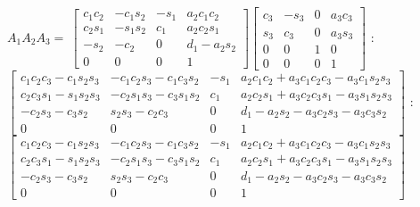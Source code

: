 \documentclass{article}
\begin{document}
$A_{1}A_{2}A_{3}=\ \left[ 
\begin{array}{cccc}
c_{1}c_{2} & -c_{1}s_{2} & -s_{1} & a_{2}c_{1}c_{2} \\ 
c_{2}s_{1} & -s_{1}s_{2} & c_{1} & a_{2}c_{2}s_{1} \\ 
-s_{2} & -c_{2} & 0 & d_{1}-a_{2}s_{2} \\ 
0 & 0 & 0 & 1%
\end{array}%
\right] \allowbreak \left[ 
\begin{array}{cccc}
c_{3} & -s_{3} & 0 & a_{3}c_{3} \\ 
s_{3} & c_{3} & 0 & a_{3}s_{3} \\ 
0 & 0 & 1 & 0 \\ 
0 & 0 & 0 & 1%
\end{array}%
\right] $ : $\left[ 
\begin{array}{cccc}
c_{1}c_{2}c_{3}-c_{1}s_{2}s_{3} & -c_{1}c_{2}s_{3}-c_{1}c_{3}s_{2} & -s_{1}
& a_{2}c_{1}c_{2}+a_{3}c_{1}c_{2}c_{3}-a_{3}c_{1}s_{2}s_{3} \\ 
c_{2}c_{3}s_{1}-s_{1}s_{2}s_{3} & -c_{2}s_{1}s_{3}-c_{3}s_{1}s_{2} & c_{1} & 
a_{2}c_{2}s_{1}+a_{3}c_{2}c_{3}s_{1}-a_{3}s_{1}s_{2}s_{3} \\ 
-c_{2}s_{3}-c_{3}s_{2} & s_{2}s_{3}-c_{2}c_{3} & 0 & 
d_{1}-a_{2}s_{2}-a_{3}c_{2}s_{3}-a_{3}c_{3}s_{2} \\ 
0 & 0 & 0 & 1%
\end{array}%
\right] \allowbreak $ : $\left[ 
\begin{array}{cccc}
c_{1}c_{2}c_{3}-c_{1}s_{2}s_{3} & -c_{1}c_{2}s_{3}-c_{1}c_{3}s_{2} & -s_{1}
& a_{2}c_{1}c_{2}+a_{3}c_{1}c_{2}c_{3}-a_{3}c_{1}s_{2}s_{3} \\ 
c_{2}c_{3}s_{1}-s_{1}s_{2}s_{3} & -c_{2}s_{1}s_{3}-c_{3}s_{1}s_{2} & c_{1} & 
a_{2}c_{2}s_{1}+a_{3}c_{2}c_{3}s_{1}-a_{3}s_{1}s_{2}s_{3} \\ 
-c_{2}s_{3}-c_{3}s_{2} & s_{2}s_{3}-c_{2}c_{3} & 0 & 
d_{1}-a_{2}s_{2}-a_{3}c_{2}s_{3}-a_{3}c_{3}s_{2} \\ 
0 & 0 & 0 & 1%
\end{array}%
\right] \allowbreak $ 

\bigskip 


\bigskip 
\end{document}
